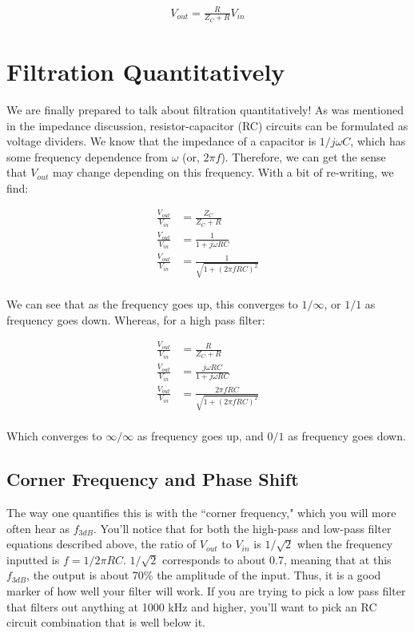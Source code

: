 \documentclass[12pt]{report}
\newcommand{\Vo}{{V}_{out}}
\newcommand{\Vi}{{V}_{in}}
\newcommand{\fdb}{{f}_{3dB}}
\begin{document}
\begin{equation} \label{imp5}
\begin{split}
\Vo = \frac{R}{Z_C + R}\Vi
\end{split}
\end{equation}

\section{Filtration Quantitatively}
We are finally prepared to talk about filtration quantitatively! As was mentioned in the impedance discussion, resistor-capacitor (RC) circuits can be formulated as voltage dividers. We know that the impedance of a capacitor is ${1} /{j\omega C}$, which has some frequency dependence from $\omega$ (or, $2\pi f$). Therefore, we can get the sense that $\Vo$ may change depending on this frequency. With a bit of re-writing, we find: 

\begin{equation} \label{imp6}
\begin{split}
\frac{\Vo}{\Vi} &= \frac{Z_C}{Z_C + R} \\
\frac{\Vo}{\Vi} &= \frac{1}{1 + j\omega RC} \\
\frac{\Vo}{\Vi} &= \frac{1}{\sqrt{1 + (2\pi f RC)^2}} \\
\end{split}
\end{equation}

We can see that as the frequency goes up, this converges to $1 / \infty$, or $1/1$ as frequency goes down. Whereas, for a high pass filter: 

\begin{equation} \label{imp7}
\begin{split}
\frac{\Vo}{\Vi} &= \frac{R}{Z_C + R} \\
\frac{\Vo}{\Vi} &= \frac{j\omega RC}{1 + j\omega RC} \\
\frac{\Vo}{\Vi} &= \frac{2\pi f RC}{\sqrt{1 + (2\pi f RC)^2}} \\
\end{split}
\end{equation}

Which converges to $\infty / \infty$ as frequency goes up, and $0 / 1$ as frequency goes down.

\subsection{Corner Frequency and Phase Shift}
The way one quantifies this is with the ``corner frequency," which you will more often hear as $\fdb$. You'll notice that for both the high-pass and low-pass filter equations described above, the ratio of $\Vo$ to $\Vi$ is $1/\sqrt{2}$ when the frequency inputted is $f = 1/2\pi RC$. $1/\sqrt{2}$ corresponds to about 0.7, meaning that at this $\fdb$, the output is about 70\% the amplitude of the input. Thus, it is a good marker of how well your filter will work. If you are trying to pick a low pass filter that filters out anything at 1000 kHz and higher, you'll want to pick an RC circuit combination that is well below it.\newline
\end{document}
